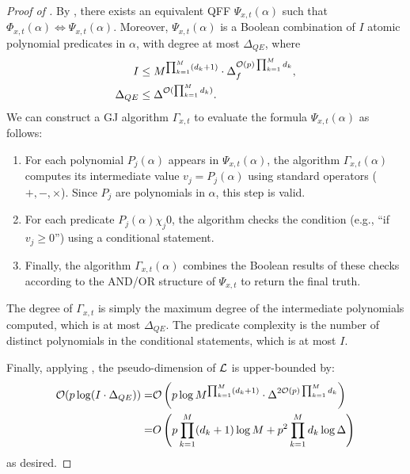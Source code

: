 \begin{proof}[Proof of ]
	By , there exists an equivalent QFF $\Psi_{x, t}(\alpha)$ such that $\Phi_{x,t}(\alpha) \Leftrightarrow \Psi_{x, t}(\alpha)$. Moreover, $\Psi_{x, t}(\alpha)$ is a Boolean combination of $I$ atomic polynomial predicates in $\alpha$, with degree at most $\Delta_{QE}$, where
	\begin{equation*}
	    \begin{aligned}
	        I &\leq M^{\prod_{k = 1}^M (d_k + 1)} \cdot \Delta_f^{\mathcal{O}(p)\prod_{k = 1}^M d_k}, \\
            \Delta_{QE} &\leq \Delta^{\mathcal{O}(\prod_{k = 1}^M d_k)}.
	    \end{aligned}
	\end{equation*}
	We can construct a GJ algorithm $\Gamma_{x, t}$ to evaluate the formula $\Psi_{x, t}(\alpha)$ as follows:
	\begin{enumerate}[leftmargin=*]
		\item For each polynomial $P_j(\alpha)$ appears in $\Psi_{x, t}(\alpha)$, the algorithm $\Gamma_{x, t}(\alpha)$ computes its intermediate value $v_j = P_j(\alpha)$ using standard operators ($+, -, \times$). Since $P_j$ are polynomials in $\alpha$, this step is valid.
		
		\item For each predicate $P_j(\alpha) \chi_j 0$, the algorithm checks the condition (e.g., ``if $v_j \geq 0$'') using a conditional statement. 
		
		\item Finally, the algorithm $\Gamma_{x, t}(\alpha)$ combines the Boolean results of these checks according to the AND/OR structure of $\Psi_{x, t}$ to return the final truth.
	\end{enumerate}
	The degree of $\Gamma_{x, t}$ is simply the maximum degree of the intermediate polynomials computed, which is at most $\Delta_{QE}$. The predicate complexity is the number of distinct polynomials in the conditional statements, which is at most $ I$. 
	
	Finally, applying , the pseudo-dimension of $\mathcal{L}$ is upper-bounded by:
	\begin{equation*}
		\begin{aligned}
			\mathcal{O}(p\log(I \cdot \Delta_{QE}))
            = &\mathcal{O}\left(p \log M^{\prod_{k = 1}^M (d_k + 1)} \cdot \Delta^{2\mathcal{O}(p) \prod_{k = 1}^M d_k}\right)\\
			= &O\left( p\prod_{k = 1}^M (d_k + 1) \log M + p^2 \prod_{k = 1}^M d_k \log \Delta\right)
		\end{aligned}
	\end{equation*}
	as desired.
\end{proof}

